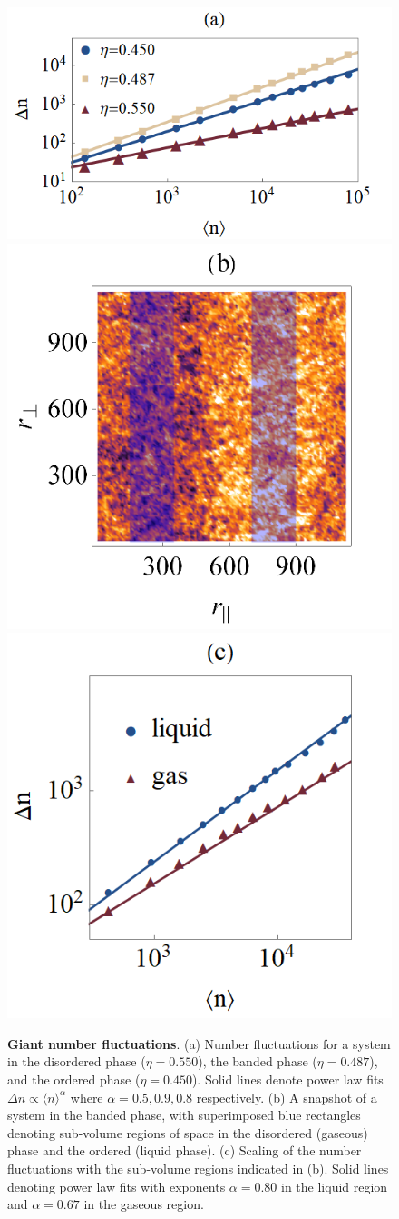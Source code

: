 \documentclass[twoside,twocolumn,9pt]{article}
\begin{document}
\begin{figure}[h]
	\centering
	\includegraphics[width=0.70\columnwidth]{gnf_bulk_phases.png}
	\includegraphics[width=0.44\columnwidth]{gnf_snapshot.png}
	\includegraphics[width=0.44\columnwidth]{gnf_subvolume.png}
	\caption{\textbf{Giant number fluctuations}.
    (a) Number fluctuations for a system in the disordered phase ($\eta=0.550$), the banded phase ($\eta=0.487$), and the ordered phase ($\eta=0.450$).
    Solid lines denote power law fits $\Delta{n}\propto\langle{n}\rangle^{\alpha}$ where $\alpha=0.5,0.9,0.8$ respectively.
    (b) A snapshot of a system in the banded phase, with superimposed blue rectangles denoting sub-volume regions of space in the disordered (gaseous) phase and the ordered (liquid phase).
    (c) Scaling of the number fluctuations with the sub-volume regions indicated in (b).
    Solid lines denoting power law fits with exponents $\alpha=0.80$ in the liquid region and $\alpha=0.67$ in the gaseous region.}
	\label{fig:giantNumberFluctuations}
\end{figure}
\end{document}
